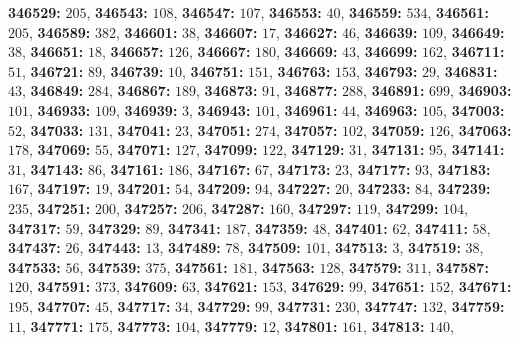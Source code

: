 \textsf{\bfseries 346529:} $205$, \textsf{\bfseries 346543:} $108$, \textsf{\bfseries 346547:} $107$, \textsf{\bfseries 346553:} $40$, \textsf{\bfseries 346559:} $534$, \textsf{\bfseries 346561:} $205$, \textsf{\bfseries 346589:} $382$, \textsf{\bfseries 346601:} $38$, \textsf{\bfseries 346607:} $17$, \textsf{\bfseries 346627:} $46$, \textsf{\bfseries 346639:} $109$, \textsf{\bfseries 346649:} $38$, \textsf{\bfseries 346651:} $18$, \textsf{\bfseries 346657:} $126$, \textsf{\bfseries 346667:} $180$, \textsf{\bfseries 346669:} $43$, \textsf{\bfseries 346699:} $162$, \textsf{\bfseries 346711:} $51$, \textsf{\bfseries 346721:} $89$, \textsf{\bfseries 346739:} $10$, \textsf{\bfseries 346751:} $151$, \textsf{\bfseries 346763:} $153$, \textsf{\bfseries 346793:} $29$, \textsf{\bfseries 346831:} $43$, \textsf{\bfseries 346849:} $284$, \textsf{\bfseries 346867:} $189$, \textsf{\bfseries 346873:} $91$, \textsf{\bfseries 346877:} $288$, \textsf{\bfseries 346891:} $699$, \textsf{\bfseries 346903:} $101$, \textsf{\bfseries 346933:} $109$, \textsf{\bfseries 346939:} $3$, \textsf{\bfseries 346943:} $101$, \textsf{\bfseries 346961:} $44$, \textsf{\bfseries 346963:} $105$, \textsf{\bfseries 347003:} $52$, \textsf{\bfseries 347033:} $131$, \textsf{\bfseries 347041:} $23$, \textsf{\bfseries 347051:} $274$, \textsf{\bfseries 347057:} $102$, \textsf{\bfseries 347059:} $126$, \textsf{\bfseries 347063:} $178$, \textsf{\bfseries 347069:} $55$, \textsf{\bfseries 347071:} $127$, \textsf{\bfseries 347099:} $122$, \textsf{\bfseries 347129:} $31$, \textsf{\bfseries 347131:} $95$, \textsf{\bfseries 347141:} $31$, \textsf{\bfseries 347143:} $86$, \textsf{\bfseries 347161:} $186$, \textsf{\bfseries 347167:} $67$, \textsf{\bfseries 347173:} $23$, \textsf{\bfseries 347177:} $93$, \textsf{\bfseries 347183:} $167$, \textsf{\bfseries 347197:} $19$, \textsf{\bfseries 347201:} $54$, \textsf{\bfseries 347209:} $94$, \textsf{\bfseries 347227:} $20$, \textsf{\bfseries 347233:} $84$, \textsf{\bfseries 347239:} $235$, \textsf{\bfseries 347251:} $200$, \textsf{\bfseries 347257:} $206$, \textsf{\bfseries 347287:} $160$, \textsf{\bfseries 347297:} $119$, \textsf{\bfseries 347299:} $104$, \textsf{\bfseries 347317:} $59$, \textsf{\bfseries 347329:} $89$, \textsf{\bfseries 347341:} $187$, \textsf{\bfseries 347359:} $48$, \textsf{\bfseries 347401:} $62$, \textsf{\bfseries 347411:} $58$, \textsf{\bfseries 347437:} $26$, \textsf{\bfseries 347443:} $13$, \textsf{\bfseries 347489:} $78$, \textsf{\bfseries 347509:} $101$, \textsf{\bfseries 347513:} $3$, \textsf{\bfseries 347519:} $38$, \textsf{\bfseries 347533:} $56$, \textsf{\bfseries 347539:} $375$, \textsf{\bfseries 347561:} $181$, \textsf{\bfseries 347563:} $128$, \textsf{\bfseries 347579:} $311$, \textsf{\bfseries 347587:} $120$, \textsf{\bfseries 347591:} $373$, \textsf{\bfseries 347609:} $63$, \textsf{\bfseries 347621:} $153$, \textsf{\bfseries 347629:} $99$, \textsf{\bfseries 347651:} $152$, \textsf{\bfseries 347671:} $195$, \textsf{\bfseries 347707:} $45$, \textsf{\bfseries 347717:} $34$, \textsf{\bfseries 347729:} $99$, \textsf{\bfseries 347731:} $230$, \textsf{\bfseries 347747:} $132$, \textsf{\bfseries 347759:} $11$, \textsf{\bfseries 347771:} $175$, \textsf{\bfseries 347773:} $104$, \textsf{\bfseries 347779:} $12$, \textsf{\bfseries 347801:} $161$, \textsf{\bfseries 347813:} $140$, 
